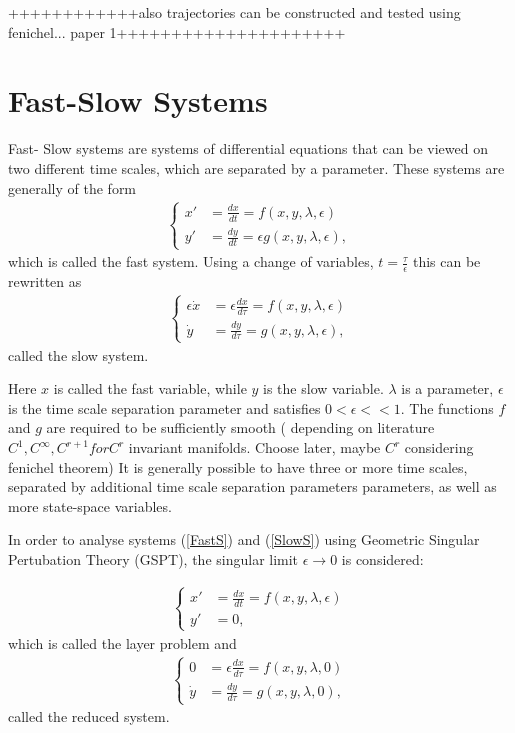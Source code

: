 ++++++++++++also trajectories can be constructed and tested using fenichel... paper 1+++++++++++++++++++++



\section{Fast-Slow Systems}\label{Intro}
Fast- Slow systems are systems of differential equations that can be viewed on two different time scales, which are separated by a parameter.
These systems are generally of the form
\begin{align} \label{FastS}
\begin{cases}
x' &=\frac{dx}{dt}= f(x,y,\lambda, \epsilon)\\
y' &= \frac{dy}{dt}= \epsilon g( x,y, \lambda, \epsilon),
\end{cases}
\end{align}
which is called the fast system.
Using a change of variables, $t = \frac{\tau}{\epsilon} $ this can be rewritten as
\begin{align}
\begin{cases}
\epsilon \dot{x} &= \epsilon \frac{dx}{d \tau} = f(x,y,\lambda, \epsilon)\\
\dot{y} & = \frac{dy}{d \tau} =  g( x,y, \lambda, \epsilon),
\end{cases}\label{SlowS}
\end{align}
called the slow system.

Here $x$ is called the fast variable, while $y$ is the slow variable. $\lambda$ is a parameter, $\epsilon$ is the time scale separation parameter and satisfies $0< \epsilon << 1$. The functions $f$ and $g$ are required to be sufficiently smooth ( depending on literature $C^1, C^\infty, C^{r+1} for C^r$ invariant manifolds. Choose later, maybe $C^r$ considering fenichel theorem)
It is generally possible to have three or more time scales, separated by additional time scale separation parameters parameters, as well as more state-space variables. 

In order to analyse systems (\ref{FastS}) and (\ref{SlowS}) using Geometric Singular Pertubation Theory (GSPT), the singular limit $\epsilon \to 0$ is considered:

\begin{align} \label{FastS0}
\begin{cases}
x' &=\frac{dx}{dt}= f(x,y,\lambda, \epsilon)\\
y' &= 0,
\end{cases}
\end{align}
which is called the layer problem and
\begin{align}\label{SlowS0}
\begin{cases}
0 &= \epsilon \frac{dx}{d \tau} = f(x,y,\lambda, 0)\\
\dot{y} & = \frac{dy}{d \tau} =  g( x,y, \lambda,0),
\end{cases}
\end{align}
called the reduced system.

